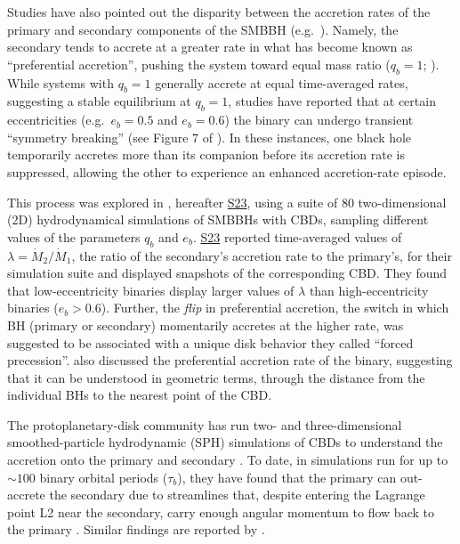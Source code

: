 \documentclass[fleqn,usenatbib]{mnras}
\newcommand{\Stwentythree}{\href{https://doi.org/10.1093/mnras/stac3263}{S23}\xspace}
\begin{document}
Studies have also pointed out the disparity between the accretion rates of the primary and secondary components of the SMBBH (e.g.\ \citealt{Dorazio+2013,farris_2014,miranda_munoz_lai_2017, siwek_prefacc, Dorazio_24_pref_mention}). Namely, the secondary tends to accrete at a greater rate in what has become known as ``preferential accretion'', pushing the system toward equal mass ratio ($q_b = 1$; \citealt{dorazio_2013, farris_2014, duffell_dorazio_2020, miranda_munoz_lai_2017, siwek_prefacc}). While systems with $q_b = 1$ generally accrete at equal time-averaged rates, suggesting a stable equilibrium at $q_b = 1$, studies have reported that at certain eccentricities (e.g.\ $e_b = 0.5$ and $e_b = 0.6$) the binary can undergo transient ``symmetry breaking'' (see Figure 7 of \citealt{munoz_miranda_lai_19}). In these instances, one black hole temporarily accretes more than its companion before its accretion rate is suppressed, allowing the other to experience an enhanced accretion-rate episode.


This process was explored in \citealt{siwek_prefacc}, hereafter \Stwentythree, using a suite of $80$ two-dimensional (2D) hydrodynamical simulations of SMBBHs with CBDs, sampling different values of the parameters $q_b$ and $e_b$. \Stwentythree reported time-averaged values of $\lambda = \dot{M}_2/\dot{M}_1$, the ratio of the secondary's accretion rate to the primary's, for their simulation suite and displayed snapshots of the corresponding CBD. They found that low-eccentricity binaries display larger values of $\lambda$ than high-eccentricity binaries ($e_b > 0.6$). Further, the \textit{flip} in preferential accretion, the switch in which BH (primary or secondary) momentarily accretes at the higher rate, was suggested to be associated with a unique disk behavior they called ``forced precession''. \citet{DeLaurentiis24} also discussed the preferential accretion rate of the binary, suggesting that it can be understood in geometric terms, through the distance from the individual BHs to the nearest point of the CBD.

The protoplanetary-disk community has run two- and three-dimensional smoothed-particle hydrodynamic (SPH) simulations of CBDs to understand the accretion onto the primary and secondary \citep{Gunther_Kley_02, Ochi_05, Young_15}. To date, in simulations run for up to $\sim 100$ binary orbital periods ($\tau_b$), they have found that the primary can out-accrete the secondary due to streamlines that, despite entering the Lagrange point L2 near the secondary, carry enough angular momentum to flow back to the primary \citep{Ochi_05, Young_15}. Similar findings are reported by \citet{Tiede_22}.
\end{document}

